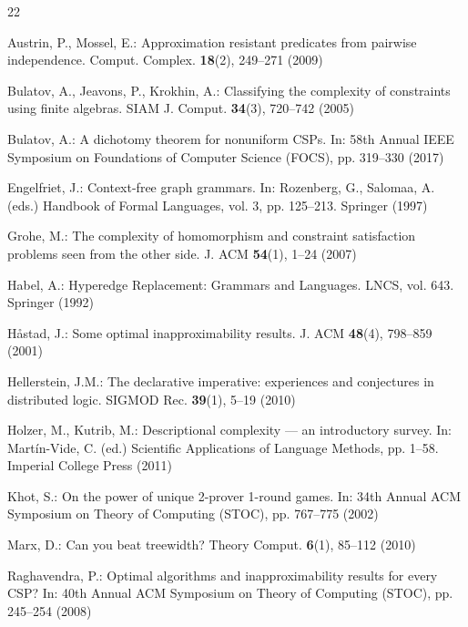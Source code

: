 \documentclass[runningheads]{llncs}
\begin{document}
% 
% 
%
\begin{thebibliography}{22}

Austrin, P., Mossel, E.: Approximation resistant predicates from pairwise independence. Comput. Complex. \textbf{18}(2), 249--271 (2009)

Bulatov, A., Jeavons, P., Krokhin, A.: Classifying the complexity of constraints using finite algebras. SIAM J. Comput. \textbf{34}(3), 720--742 (2005)

Bulatov, A.: A dichotomy theorem for nonuniform CSPs. In: 58th Annual IEEE Symposium on Foundations of Computer Science (FOCS), pp. 319--330 (2017)

Engelfriet, J.: Context-free graph grammars. In: Rozenberg, G., Salomaa, A. (eds.) Handbook of Formal Languages, vol. 3, pp. 125--213. Springer (1997)

Grohe, M.: The complexity of homomorphism and constraint satisfaction problems seen from the other side. J. ACM \textbf{54}(1), 1--24 (2007)

Habel, A.: Hyperedge Replacement: Grammars and Languages. LNCS, vol. 643. Springer (1992)

H\aa stad, J.: Some optimal inapproximability results. J. ACM \textbf{48}(4), 798--859 (2001)

Hellerstein, J.M.: The declarative imperative: experiences and conjectures in distributed logic. SIGMOD Rec. \textbf{39}(1), 5--19 (2010)

Holzer, M., Kutrib, M.: Descriptional complexity --- an introductory survey. In: Mart\'in-Vide, C. (ed.) Scientific Applications of Language Methods, pp. 1--58. Imperial College Press (2011)

Khot, S.: On the power of unique 2-prover 1-round games. In: 34th Annual ACM Symposium on Theory of Computing (STOC), pp. 767--775 (2002)

Marx, D.: Can you beat treewidth? Theory Comput. \textbf{6}(1), 85--112 (2010)

Raghavendra, P.: Optimal algorithms and inapproximability results for every CSP? In: 40th Annual ACM Symposium on Theory of Computing (STOC), pp. 245--254 (2008)


\end{thebibliography}
\end{document}
